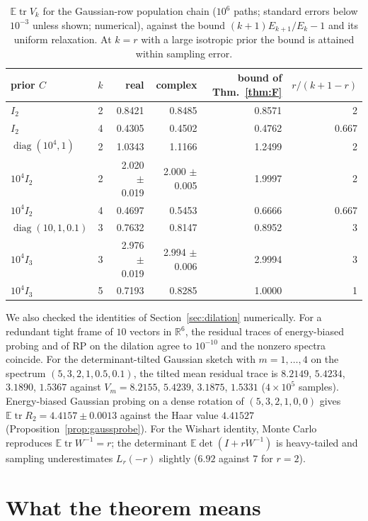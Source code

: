 \documentclass[11pt,a4paper]{article}
\theoremstyle{definition}
\newcommand{\E}{\mathbb{E}}
\newcommand{\R}{\mathbb{R}}
\newcommand{\tr}{\operatorname{tr}}
\newcommand{\diag}{\operatorname{diag}}
\begin{document}
\begin{table}[h]
\centering\small
\begin{tabular}{@{}lr|rr|r|r@{}}
\toprule
prior $C$ & $k$ & real & complex & bound of Thm.~\ref{thm:F} & $r/(k+1-r)$\\
\midrule
$I_2$ & 2 & 0.8421 & 0.8485 & 0.8571 & 2\\
$I_2$ & 4 & 0.4305 & 0.4502 & 0.4762 & 0.667\\
$\diag(10^4,1)$ & 2 & 1.0343 & 1.1166 & 1.2499 & 2\\
$10^4I_2$ & 2 & 2.020 $\pm$ 0.019 & 2.000 $\pm$ 0.005 & 1.9997 & 2\\
$10^4I_2$ & 4 & 0.4697 & 0.5453 & 0.6666 & 0.667\\
$\diag(10,1,0.1)$ & 3 & 0.7632 & 0.8147 & 0.8952 & 3\\
$10^4I_3$ & 3 & 2.976 $\pm$ 0.019 & 2.994 $\pm$ 0.006 & 2.9994 & 3\\
$10^4I_3$ & 5 & 0.7193 & 0.8285 & 1.0000 & 1\\
\bottomrule
\end{tabular}
\caption{$\E\tr V_k$ for the Gaussian-row population chain ($10^6$ paths; standard errors below $10^{-3}$ unless shown; numerical), against the bound $(k+1)E_{k+1}/E_k-1$ and its uniform relaxation. At $k=r$ with a large isotropic prior the bound is attained within sampling error.}
\label{tab:pop}
\end{table}

We also checked the identities of Section~\ref{sec:dilation} numerically. For a redundant tight frame of $10$ vectors in $\R^6$, the residual traces of energy-biased probing and of RP on the dilation agree to $10^{-10}$ and the nonzero spectra coincide. For the determinant-tilted Gaussian sketch with $m=1,\dots,4$ on the spectrum $(5,3,2,1,0.5,0.1)$, the tilted mean residual trace is $8.2149$, $5.4234$, $3.1890$, $1.5367$ against $V_m=8.2155$, $5.4239$, $3.1875$, $1.5331$ ($4\times10^5$ samples). Energy-biased Gaussian probing on a dense rotation of $(5,3,2,1,0,0)$ gives $\E\tr R_2=4.4157\pm0.0013$ against the Haar value $4.41527$ (Proposition~\ref{prop:gaussprobe}). For the Wishart identity, Monte Carlo reproduces $\E\tr W^{-1}=r$; the determinant $\E\det(I+rW^{-1})$ is heavy-tailed and sampling underestimates $L_r(-r)$ slightly ($6.92$ against $7$ for $r=2$).
\section{What the theorem means}\label{sec:meaning}
\end{document}

